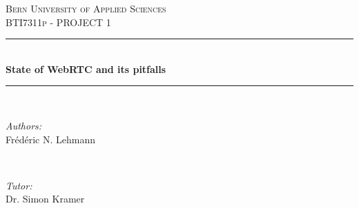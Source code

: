 	\begin{titlepage}\sffamily
		
		\newcommand{\HRule}{\rule{\linewidth}{0.5mm}} %
		
		\center %
		
		
		\textsc{\LARGE Bern University of Applied Sciences}\\[1.5cm] %
		\textsc{\Large BTI7311p - PROJECT 1}\\[1.5cm] %
		
		
		\HRule \\[0.4cm]
		{ \huge \bfseries State of WebRTC and its pitfalls}\\[0.2cm] %
		\HRule \\[1.5cm]
		
		
		\begin{minipage}{0.4\textwidth}
			\begin{flushleft} \large
				\emph{Authors:}\\
				Frédéric N. Lehmann
			\end{flushleft}
		\end{minipage}
		~
		\begin{minipage}{0.4\textwidth}
			\begin{flushright} \large
				\emph{Tutor:} \\
				Dr. Simon Kramer \\
			\end{flushright}
		\end{minipage}\\[2cm]
        
		

\end{titlepage}
